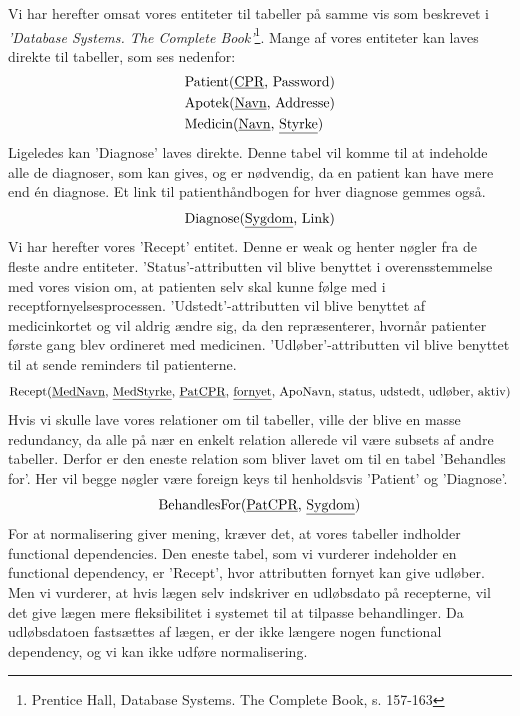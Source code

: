 Vi har herefter omsat vores entiteter til tabeller på samme vis som beskrevet i \textit{'Database Systems. The Complete Book'}\footnote{Prentice Hall, Database Systems. The Complete Book, s. 157-163}. Mange af vores entiteter kan laves direkte til tabeller, som ses nedenfor:
\begin{align*}
	&\textrm{Patient}(\textrm{\underline{CPR}, Password})\\
	&\textrm{Apotek}(\textrm{\underline{Navn}, Addresse})\\
	&\textrm{Medicin}(\textrm{\underline{Navn}, \underline{Styrke}})\\
\end{align*}
Ligeledes kan 'Diagnose' laves direkte. Denne tabel vil komme til at indeholde alle de diagnoser, som kan gives, og er nødvendig, da en patient kan have mere end én diagnose. Et link til patienthåndbogen for hver diagnose gemmes også.
\begin{equation*}
\textrm{Diagnose}(\textrm{\underline{Sygdom}, Link})
\end{equation*}
Vi har herefter vores 'Recept' entitet. Denne er weak og henter nøgler fra de fleste andre entiteter. 'Status'-attributten vil blive benyttet i overensstemmelse med vores vision om, at patienten selv skal kunne følge med i receptfornyelsesprocessen. 'Udstedt'-attributten vil blive benyttet af medicinkortet og vil aldrig ændre sig, da den repræsenterer, hvornår patienter første gang blev ordineret med medicinen. 'Udløber'-attributten vil blive benyttet til at sende reminders til patienterne.
\begin{equation*}
	\textrm{Recept}(\textrm{\underline{MedNavn}, \underline{MedStyrke}, \underline{PatCPR}, \underline{fornyet}, ApoNavn, status, udstedt, udløber, aktiv})
\end{equation*}
Hvis vi skulle lave vores relationer om til tabeller, ville der blive en masse redundancy, da alle på nær en enkelt relation allerede vil være subsets af andre tabeller. Derfor er den eneste relation som bliver lavet om til en tabel 'Behandles for'. Her vil begge nøgler være foreign keys til henholdsvis 'Patient' og 'Diagnose'.
\begin{equation*}
\textrm{BehandlesFor}(\textrm{\underline{PatCPR}, \underline{Sygdom}})
\end{equation*}
For at normalisering giver mening, kræver det, at vores tabeller indholder functional dependencies. Den eneste tabel, som vi vurderer indeholder en functional dependency, er 'Recept', hvor attributten fornyet kan give udløber. Men vi vurderer, at hvis lægen selv indskriver en udløbsdato på recepterne, vil det give lægen mere fleksibilitet i systemet til at tilpasse behandlinger. Da udløbsdatoen fastsættes af lægen, er der ikke længere nogen functional dependency, og vi kan ikke udføre normalisering.
